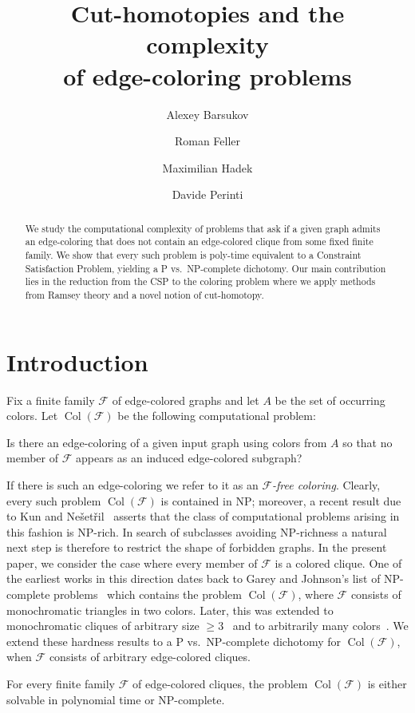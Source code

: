 \documentclass[oneside]{amsart}
\title[Cut-homotopies and the complexity of edge-coloring problems]{Cut-homotopies and the complexity\\ of edge-coloring problems}
\author{Alexey Barsukov}
\author{Roman Feller}
\author{Maximilian Hadek}
\author{Davide Perinti}
\DeclareMathOperator{\col}{Col}
\newcommand{\cat}[1]{\mathcal{#1}}
\begin{document}
\begin{abstract}
    We study the computational complexity of problems that ask if a given graph admits an edge-coloring that does not contain an edge-colored clique from some fixed finite family.
    We show that every such problem is poly-time equivalent to a Constraint Satisfaction Problem, yielding a P vs.\ NP-complete dichotomy.
    Our main contribution lies in the reduction from the CSP to the coloring problem where we apply methods from Ramsey theory and a novel notion of cut-homotopy.
\end{abstract}

\makeatletter
\let\oldmakefntext\@makefntext
\renewcommand{\@makefntext}[1]{\noindent#1}
\maketitle
\let\@makefntext\oldmakefntext
\makeatother

\thispagestyle{empty}

\vspace{-0.4cm}

\section{Introduction}\label{section:introduction}

Fix a finite family $\cat F$ of edge-colored graphs and let $A$ be the set of occurring colors. Let $\col(\cat F)$ be the following computational problem:
\begin{center}\vspace{0.75em}
   {\it \parbox{0.85\textwidth}{Is there an edge-coloring of a given input graph using colors from $A$ so that no member of $\cat F$ appears as an induced edge-colored subgraph?} } \vspace{0.75em}
\end{center}
If there is such an edge-coloring we refer to it as an \emph{$\cat F$-free coloring}.
Clearly, every such problem $\col( \cat F)$ is contained in  NP; moreover, a recent result due to Kun and Ne\v{s}et\v{r}il~\cite[Th.~4.1]{KunNesetril} asserts that the class of computational problems arising in this fashion is NP-rich. 
In search of subclasses avoiding NP-richness a natural next step is therefore to restrict the shape of forbidden graphs.
In the present paper, we consider the case where every member of $\cat F$ is a colored clique.
One of the earliest works in this direction dates back to Garey and Johnson's list of NP-complete problems~\cite{GareyJohnson} which contains the problem $\col(\cat F)$, where $\cat F$ consists of monochromatic triangles in two colors.
Later, this was extended to monochromatic cliques of arbitrary size $\geq 3$~\cite{Burr} and to arbitrarily many colors~\cite{SiggersCliques, BarsukovMottetPerinti}.
We extend these hardness results to a P vs.\ NP-complete dichotomy for $\col(\cat F)$, when $\cat F$ consists of arbitrary edge-colored cliques.
\begin{theorem}\label{thm:main}
    For every finite family $\mathcal F$ of edge-colored cliques, the problem $\col(\mathcal F)$ is either solvable in polynomial time or NP-complete.
\end{theorem}
\end{document}
